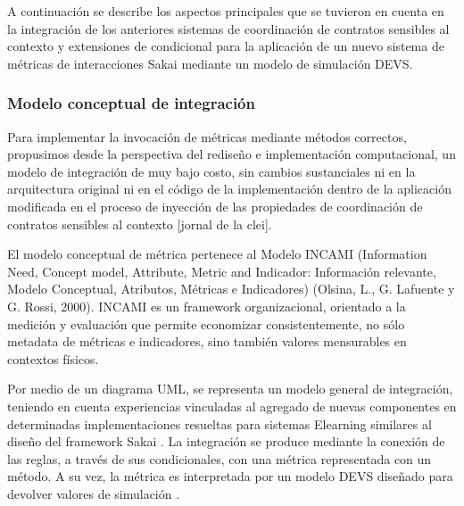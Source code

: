 A continuación se describe los  aspectos principales que se tuvieron en cuenta en la integración de los anteriores sistemas de coordinación de contratos sensibles al contexto y extensiones de condicional para la aplicación de un nuevo sistema de métricas  de interacciones Sakai mediante un modelo de simulación DEVS. 


\subsubsection {Modelo conceptual de integración}

Para implementar la invocación de métricas mediante métodos correctos, propusimos  desde la perspectiva del rediseño e implementación computacional, un modelo de integración de muy bajo costo, sin cambios sustanciales ni en la arquitectura original  ni en el código de la implementación dentro de la aplicación modificada en el proceso de inyección de las propiedades de coordinación de contratos sensibles al contexto [jornal de la clei].

El modelo conceptual de métrica pertenece al Modelo INCAMI (Information Need, Concept model, Attribute, Metric and Indicador: Información relevante, Modelo Conceptual, Atributos, Métricas e Indicadores) (Olsina, L., G. Lafuente y G. Rossi, 2000). INCAMI es un framework organizacional, orientado a la medición y evaluación que permite economizar consistentemente, no sólo metadata de métricas e indicadores, sino también valores mensurables en contextos físicos.

Por medio de un diagrama UML, se representa un modelo general de integración, teniendo en cuenta experiencias vinculadas al agregado de nuevas componentes en determinadas implementaciones resueltas para sistemas Elearning similares al diseño del framework Sakai \cite{libro}. La integración se produce mediante la conexión de las reglas, a través de sus condicionales, con una métrica representada con un método. A su vez,  la métrica es interpretada por un modelo DEVS diseñado para devolver valores de simulación \cite{poner paper de la jaiio o algo parecido a eso}.

